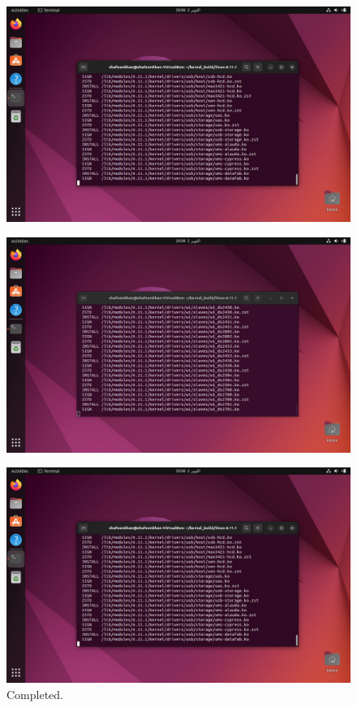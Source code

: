 \documentclass{article}
\begin{document}
\begin{figure}[H]
    \centering
    \includegraphics[width=0.8\linewidth]{10.jpg}
    \caption{ }
\end{figure}

\begin{figure}[H]
    \centering
    \includegraphics[width=0.8\linewidth]{09.jpg}
    \caption{ }
\end{figure}

\begin{figure}[H]
    \centering
    \includegraphics[width=0.8\linewidth]{10.jpg}
    \caption{Completed.}
\end{figure}
\end{document}
